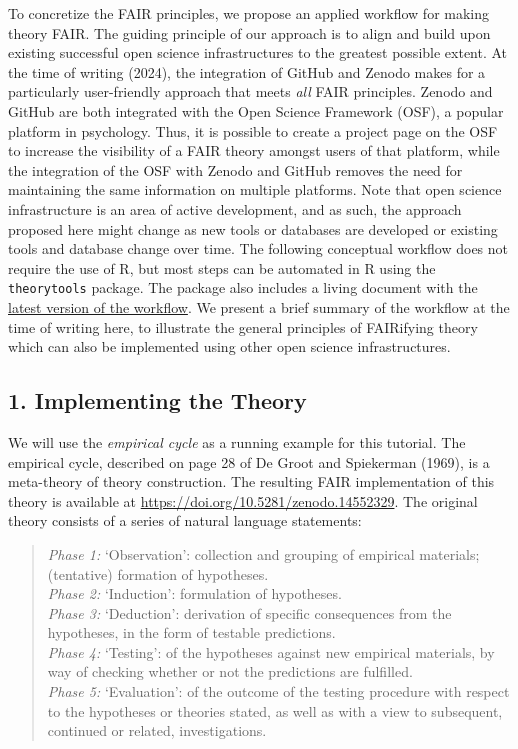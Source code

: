 \documentclass[
  man, noextraspace,floatsintext]{apa7}
\begin{document}
To concretize the FAIR principles,
we propose an applied workflow for making theory FAIR.
The guiding principle of our approach is to align and build upon existing successful open science infrastructures to the greatest possible extent.
At the time of writing (2024),
the integration of GitHub and Zenodo makes for a particularly user-friendly approach that meets \emph{all} FAIR principles.
Zenodo and GitHub are both integrated with the Open Science Framework (OSF),
a popular platform in psychology.
Thus, it is possible to create a project page on the OSF to increase the visibility of a FAIR theory amongst users of that platform,
while the integration of the OSF with Zenodo and GitHub removes the need for maintaining the same information on multiple platforms.
Note that open science infrastructure is an area of active development, and as such,
the approach proposed here might change as new tools or databases are developed or existing tools and database change over time.
The following conceptual workflow does not require the use of R, but most steps can be automated in R using the \texttt{theorytools} package.
The package also includes a living document with the \href{https://cjvanlissa.github.io/theorytools/articles/fair-theory.html}{latest version of the workflow}.
We present a brief summary of the workflow at the time of writing here,
to illustrate the general principles of FAIRifying theory which can also be implemented using other open science infrastructures.

\subsection{1. Implementing the Theory}\label{implementing-the-theory}

We will use the \emph{empirical cycle} as a running example for this tutorial.
The empirical cycle, described on page 28 of De Groot and Spiekerman (1969),
is a meta-theory of theory construction.
The resulting FAIR implementation of this theory is available at \url{https://doi.org/10.5281/zenodo.14552329}.
The original theory consists of a series of natural language statements:

\begin{quote}
\emph{Phase 1:} `Observation': collection and grouping of empirical materials; (tentative) formation of hypotheses.\\
\emph{Phase 2:} `Induction': formulation of hypotheses.\\
\emph{Phase 3:} `Deduction': derivation of specific consequences from the hypotheses, in the form of testable predictions.\\
\emph{Phase 4:} `Testing': of the hypotheses against new empirical materials, by way of checking whether or not the predictions are fulfilled.\\
\emph{Phase 5:} `Evaluation': of the outcome of the testing procedure with respect to the hypotheses or theories stated, as well as with a view to subsequent, continued or related, investigations.
\end{quote}
\end{document}
